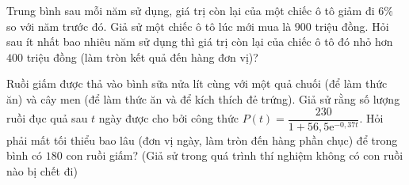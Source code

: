 \begin{bt}%

	Trung bình sau mỗi năm sử dụng, giá trị còn lại của một chiếc ô tô giảm đi $6 \%$ so với năm trước đó. Giả sử một chiếc ô tô lúc mới mua là $900$ triệu đồng. Hỏi sau ít nhất bao nhiêu năm sử dụng thì giá trị còn lại của chiếc ô tô đó nhỏ hơn $400$ triệu đồng (làm tròn kết quả đến hàng đơn vị)?
\end{bt}

\begin{bt}%

	Ruồi giấm được thả vào bình sữa nửa lít cùng với một quả chuối (để làm thức ăn) và cây men (để làm thức ăn và để kích thích đẻ trứng). Giả sử rằng số lượng ruồi đục quả sau $t$ ngày được cho bởi công thức $P(t)=\dfrac{230}{1+56{,}5\mathrm{e}^{-0{,}37t}}$. Hỏi phải mất tối thiểu bao lâu (đơn vị ngày, làm tròn đến hàng phần chục) để trong bình có $180$ con ruồi giấm? (Giả sử trong quá trình thí nghiệm không có con ruồi nào bị chết đi)
\end{bt}

